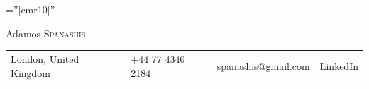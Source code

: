 \documentclass[a4paper,11pt]{article}
\begin{document}

\pagestyle{empty} %

\font\fb=''[cmr10]'' %

\par{\centering
		{\Huge Adamos \textsc{Spanashis}
	}\bigskip\par}



\begin{tabular}{ p{}  p{} p{} >{\raggedleft\arraybackslash}p{}}
  London, United Kingdom &+44 77 4340 2184 &
  \href{mailto:spanashis@gmail.com}{spanashis@gmail.com}&
    \href{https://www.linkedin.com/in/spanashis/}{LinkedIn}
\end{tabular}


 
\end{document}
